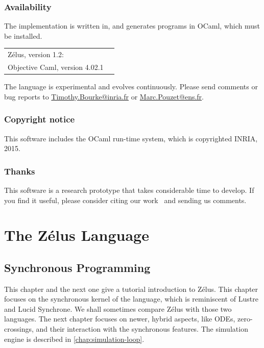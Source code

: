 \documentclass[11pt,titlepage,twoside]{report}
\newcommand{\zelus}{{\sf Z\'elus}}
\newcommand{\lustre}{{\sf Lustre}}
\newcommand{\lucy}{{\sf Lucid Synchrone}}
\newcommand{\ocaml}{{\sf OCaml}}
\begin{document}
\section*{Availability}
The implementation is written in, and generates programs in \ocaml, which 
must be installed.
\begin{center}
\begin{tabular}{ll}
  \zelus, version 1.2:  & 
  \ahrefurl{\url{http://zelus.di.ens.fr}} \\
  Objective Caml, version 4.02.1  & 
  \ahrefurl{\url{http://www.ocaml.org}}
\end{tabular}
\end{center}
The language is experimental and evolves continuously. Please send
comments or bug reports to \url{Timothy.Bourke@inria.fr} or 
\url{Marc.Pouzet@ens.fr}. 

\section*{Copyright notice}
This software includes the \ocaml{} run-time system, which is
copyrighted INRIA, 2015. 

\section*{Thanks}

This software is a research prototype that takes considerable time to 
develop.
If you find it useful, please consider citing our work~\cite{lucy:hscc13} 
and sending us comments.

\cleardoublepage
\part{The Z\'elus Language}
\cleardoublepage

\chapter{Synchronous Programming}\label{chap:sync-programming} %

This chapter and the next one give a tutorial introduction to \zelus. This
chapter focuses on the synchronous kernel of the language, which is 
reminiscent of \lustre{} and \lucy.
We shall sometimes compare \zelus{} with those two languages.
The next chapter focuses on newer, hybrid aspects, like \acp{ODE},
zero-crossings, and their interaction with the synchronous features.
The simulation engine is described in \cref{chap:simulation-loop}.
\end{document}
